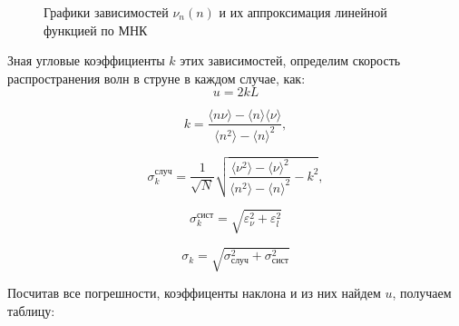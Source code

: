 \documentclass[
a4paper, %
12pt, %
]{article}
\begin{document}
	\begin{figure}[h!]
		\caption{Графики зависимостей $\nu_n(n)$ и их аппроксимация линейной функцией по МНК}
		\label{mnk_graph}
	\end{figure}
	
	\newpage
	
	Зная угловые коэффициенты $k$ этих зависимостей, определим скорость распространения волн в струне в каждом случае, как:
	\[u = 2kL \]
	
	\begin{equation}
		k=\frac{\langle n\nu\rangle-\langle n\rangle \langle \nu\rangle}{\langle n^2\rangle - \langle n\rangle^2},
	\end{equation}
	
	\begin{equation}
		\sigma_k^\text{случ}=\frac{1}{\sqrt{N}}\sqrt{\frac{\langle \nu^2 \rangle - \langle \nu \rangle^2}{\langle n^2 \rangle - \langle n \rangle^2} - k^2  },
	\end{equation}
	
	\begin{equation}
		\sigma_k^{\text{сист}} = \sqrt{ \varepsilon_\nu^2 + \varepsilon_l^2 }
	\end{equation}
	
	\begin{equation}
		\sigma_k = \sqrt{\sigma_\text{случ}^2 + \sigma_\text{сист}^2}
	\end{equation}
	
	Посчитав все погрешности, коэффиценты наклона и из них найдем $u$, получаем таблицу:
	
\end{document}
